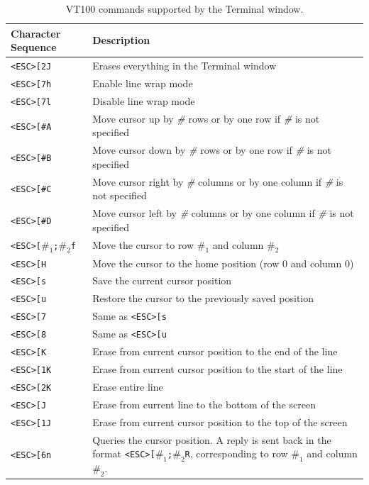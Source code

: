\documentclass[11pt, twoside, pdftex]{article}
\begin{document}
\begin{table}[H]
    \centering
    \begin{tabular}{|l|p{4in}|}
        \hline
        Character Sequence&Description\\
        \hline
        \hline
        \texttt{<ESC>[2J}&Erases everything in the Terminal window\\
        \hline
        \texttt{<ESC>[7h}&Enable line wrap mode\\
        \hline
        \texttt{<ESC>[7l}&Disable line wrap mode\\
        \hline
        \texttt{<ESC>[\emph{\#}A}&Move cursor up by \emph{\#} rows or by one row if \emph{\#} is not specified\\
        \hline
        \texttt{<ESC>[\emph{\#}B}&Move cursor down by \emph{\#} rows or by one row if \emph{\#} is not specified\\
        \hline
        \texttt{<ESC>[\emph{\#}C}&Move cursor right by \emph{\#} columns or by one column if \emph{\#} is not specified\\
        \hline
        \texttt{<ESC>[\emph{\#}D}&Move cursor left by \emph{\#} columns or by one column if \emph{\#} is not specified\\
        \hline
        \texttt{<ESC>[\emph{$\#_1$};\emph{$\#_2$}f}&Move the cursor to row \emph{$\#_1$} and column \emph{$\#_2$}\\
        \hline
        \texttt{<ESC>[H}&Move the cursor to the home position (row 0 and column 0)\\
        \hline
        \texttt{<ESC>[s}&Save the current cursor position\\
        \hline
        \texttt{<ESC>[u}&Restore the cursor to the previously saved position\\
        \hline
        \texttt{<ESC>[7}&Same as \texttt{<ESC>[s}\\
        \hline
        \texttt{<ESC>[8}&Same as \texttt{<ESC>[u}\\
        \hline
        \texttt{<ESC>[K}&Erase from current cursor position to the end of the line\\
        \hline
        \texttt{<ESC>[1K}&Erase from current cursor position to the start of the line\\
        \hline
        \texttt{<ESC>[2K}&Erase entire line\\
        \hline
        \texttt{<ESC>[J}&Erase from current line to the bottom of the screen\\
        \hline
        \texttt{<ESC>[1J}&Erase from current cursor position to the top of the screen\\
        \hline
        \texttt{<ESC>[6n}&Queries the cursor position. A reply is sent back in the format \texttt{<ESC>[\emph{$\#_1$};\emph{$\#_2$}R},
            corresponding to row \emph{$\#_1$} and column \emph{$\#_2$}.\\
        \hline
    \end{tabular}

    \caption{VT100 commands supported by the Terminal window.}
		 \label{tbl:1}
\end{table}
\end{document}
